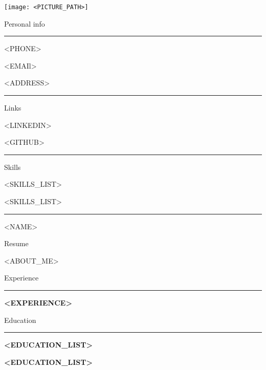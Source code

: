 \documentclass{letter}
\begin{document}
\begin{minipage}[t]{0.40\textwidth}
\setlength{\baselineskip}{1.5\baselineskip}
\color{white}
\vspace{1cm}

\texttt{[image: <PICTURE\_PATH>]}

{\large Personal info}

\rule{\linewidth}{0.4pt}

\faPhone \quad <PHONE>


\faEnvelope \quad <EMAIl>


\faMapMarker \quad <ADDRESS>

\rule{\linewidth}{0.4pt}

{\large Links}

\faCode \quad <LINKEDIN>

\faGithub \quad <GITHUB>

\rule{\linewidth}{0.4pt}

{\large Skills}

\faCircleNotch \quad <SKILLS_LIST>

\faCircleNotch \quad <SKILLS_LIST>


\rule{\linewidth}{0.4pt}


\end{minipage}
\hfill
\begin{minipage}[t]{0.60\textwidth}
\setlength{\baselineskip}{1.5\baselineskip}
\vspace{0.8cm}
{\huge <NAME>}

{\large Resume}

\vspace{0.5cm}
 
<ABOUT_ME>

\vspace{0.5cm}

{\large Experience}
\rule{\linewidth}{0.4pt}

{\large \textbf{<EXPERIENCE>}}

{\large Education}
\rule{\linewidth}{0.4pt}

{\large \textbf{<EDUCATION_LIST>}}

{\large \textbf{<EDUCATION_LIST>}}


\end{minipage}
\end{document}
